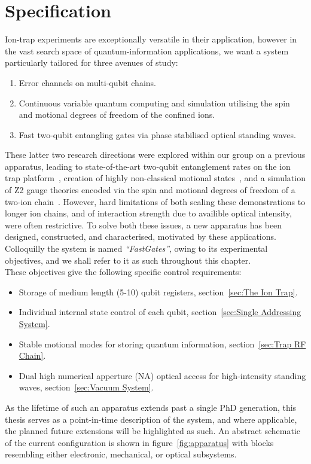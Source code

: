 \section{Specification}
\label{sec:Spec}
    Ion-trap experiments are exceptionally versatile in their application, however in the vast search space of quantum-information applications, we want a system particularly tailored for three avenues of study: 
    \begin{enumerate}
        \item Error channels on multi-qubit chains.
        \item Continuous variable quantum computing and simulation utilising the spin and motional degrees of freedom of the confined ions.
        \item Fast two-qubit entangling gates via phase stabilised optical standing waves.
    \end{enumerate}
    These latter two research directions were explored within our group on a
    previous apparatus, leading to state-of-the-art two-qubit entanglement rates
    on the ion trap platform~\cite{schafer_fast_2018,saner_breaking_2023}, creation
    of highly non-classical motional
    states~\cite{bazavan_squeezing_2024,saner_generating_2024}, and a simulation of
    Z2 gauge theories encoded via the spin and motional degrees of freedom of a
    two-ion chain~\cite{bazavan_synthetic_2023, saner_real-time_2025}. However, hard
    limitations of both scaling these demonstrations to longer ion chains, and
    of interaction strength due to availible optical intensity, were often
    restrictive. To solve both these issues, a new apparatus has been designed,
    constructed, and characterised, motivated by these applications. Colloquilly
    the system is named \textit{``FastGates''}, owing to its
    experimental objectives, and we shall refer to it as such throughout this
    chapter. \\
    These objectives give the following specific control requirements:
    \begin{itemize}
        \item Storage of medium length (5-10) qubit registers, section~\ref{sec:The Ion Trap}.
        \item Individual internal state control of each qubit, section~\ref{sec:Single Addressing System}.
        \item Stable motional modes for storing quantum information, section~\ref{sec:Trap RF Chain}.
        \item Dual high numerical apperture (NA) optical access for high-intensity standing waves, section~\ref{sec:Vacuum System}.
    \end{itemize}
    As the lifetime of such an apparatus extends past a single PhD generation,
    this thesis serves as a point-in-time description of the system, and where
    applicable, the planned future extensions will be highlighted as such. An
    abstract schematic of the current configuration is shown in
    figure~\ref{fig:apparatus} with blocks resembling either electronic,
    mechanical, or optical subsystems.

